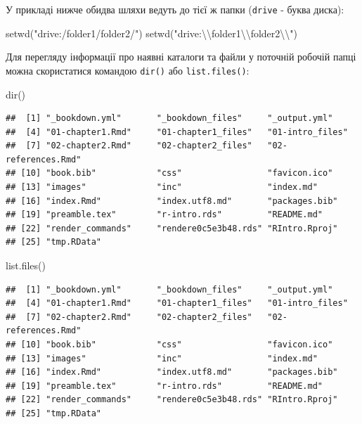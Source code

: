 \documentclass[
]{book}
\newenvironment{Shaded}{\begin{snugshade}}{\end{snugshade}}
\newcommand{\FunctionTok}[1]{\textcolor[rgb]{0.00,0.00,0.00}{#1}}
\newcommand{\NormalTok}[1]{#1}
\newcommand{\SpecialCharTok}[1]{\textcolor[rgb]{0.00,0.00,0.00}{#1}}
\newcommand{\StringTok}[1]{\textcolor[rgb]{0.31,0.60,0.02}{#1}}
\begin{document}
У прикладі нижче обидва шляхи ведуть до тієї ж папки (\texttt{drive} - буква диска):

\begin{Shaded}
\begin{Highlighting}[]
\FunctionTok{setwd}\NormalTok{(}\StringTok{"drive:/folder1/folder2/"}\NormalTok{)}
\FunctionTok{setwd}\NormalTok{(}\StringTok{"drive:}\SpecialCharTok{\textbackslash{}\textbackslash{}}\StringTok{folder1}\SpecialCharTok{\textbackslash{}\textbackslash{}}\StringTok{folder2}\SpecialCharTok{\textbackslash{}\textbackslash{}}\StringTok{"}\NormalTok{)}
\end{Highlighting}
\end{Shaded}

Для перегляду інформації про наявні каталоги та файли у поточній робочій папці можна скористатися командою \texttt{dir()} або \texttt{list.files()}:

\begin{Shaded}
\begin{Highlighting}[]
\FunctionTok{dir}\NormalTok{()}
\end{Highlighting}
\end{Shaded}

\begin{verbatim}
##  [1] "_bookdown.yml"       "_bookdown_files"     "_output.yml"        
##  [4] "01-chapter1.Rmd"     "01-chapter1_files"   "01-intro_files"     
##  [7] "02-chapter2.Rmd"     "02-chapter2_files"   "02-references.Rmd"  
## [10] "book.bib"            "css"                 "favicon.ico"        
## [13] "images"              "inc"                 "index.md"           
## [16] "index.Rmd"           "index.utf8.md"       "packages.bib"       
## [19] "preamble.tex"        "r-intro.rds"         "README.md"          
## [22] "render_commands"     "rendere0c5e3b48.rds" "RIntro.Rproj"       
## [25] "tmp.RData"
\end{verbatim}

\begin{Shaded}
\begin{Highlighting}[]
\FunctionTok{list.files}\NormalTok{()}
\end{Highlighting}
\end{Shaded}

\begin{verbatim}
##  [1] "_bookdown.yml"       "_bookdown_files"     "_output.yml"        
##  [4] "01-chapter1.Rmd"     "01-chapter1_files"   "01-intro_files"     
##  [7] "02-chapter2.Rmd"     "02-chapter2_files"   "02-references.Rmd"  
## [10] "book.bib"            "css"                 "favicon.ico"        
## [13] "images"              "inc"                 "index.md"           
## [16] "index.Rmd"           "index.utf8.md"       "packages.bib"       
## [19] "preamble.tex"        "r-intro.rds"         "README.md"          
## [22] "render_commands"     "rendere0c5e3b48.rds" "RIntro.Rproj"       
## [25] "tmp.RData"
\end{verbatim}
\end{document}
